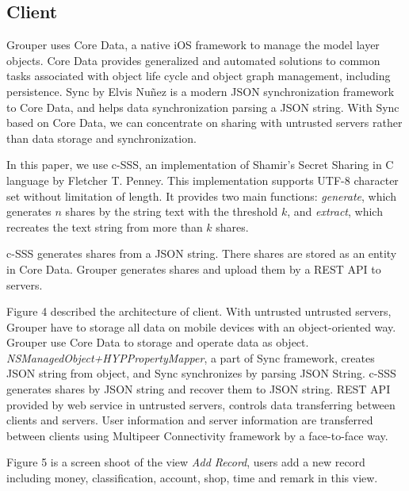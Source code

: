 \documentclass[twocolumn,10pt]{article}
\begin{document}
\subsection{Client}
 Grouper uses Core Data\cite{coredata}, a native iOS framework to manage the model layer objects. Core Data provides generalized and automated solutions to common tasks associated with object life cycle and object graph management, including persistence. Sync\cite{sync} by Elvis Nu\~{n}ez is a modern JSON synchronization framework to Core Data, and helps data synchronization parsing a JSON string. With Sync based on Core Data, we can concentrate on sharing with untrusted servers rather than data storage and synchronization.

In this paper, we use c-SSS\cite{c-sss}, an implementation of Shamir's Secret Sharing in C language by Fletcher T. Penney. This implementation supports UTF-8 character set without limitation of length. It provides two main functions: \emph{generate}, which generates $n$ shares by the string text with the threshold $k$, and \emph{extract}, which recreates the text string from more than $k$ shares. 

c-SSS generates shares from a JSON string. There shares are stored as an entity in Core Data. Grouper generates shares and upload them by a REST API to servers.

Figure 4 described the architecture of client. With untrusted untrusted servers, Grouper have to storage all data on mobile devices with an object-oriented way. Grouper use Core Data to storage and operate data as object. \emph{NSManagedObject+HYPPropertyMapper}, a part of Sync framework, creates JSON string from object, and Sync synchronizes by parsing JSON String. c-SSS generates shares by JSON string and recover them to JSON string. REST API provided by web service in untrusted servers, controls data transferring between clients and servers. User information and server information are transferred between clients using Multipeer Connectivity framework by a face-to-face way.

Figure 5 is a screen shoot of the view \emph{Add Record}, users add a new record including money, classification, account, shop, time and remark in this view.
\end{document}
